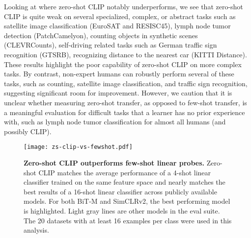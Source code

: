 \documentclass{article}
\begin{document}
Looking at where zero-shot CLIP notably underperforms, we see that zero-shot CLIP is quite weak on several specialized, complex, or abstract tasks such as satellite image classification (EuroSAT and RESISC45), lymph node tumor detection (PatchCamelyon), counting objects in synthetic scenes (CLEVRCounts), self-driving related tasks such as German traffic sign recognition (GTSRB), recognizing distance to the nearest car (KITTI Distance). These results highlight the poor capability of zero-shot CLIP on more complex tasks. By contrast, non-expert humans can robustly perform several of these tasks, such as counting, satellite image classification, and traffic sign recognition, suggesting significant room for improvement. However, we caution that it is unclear whether measuring zero-shot transfer, as opposed to few-shot transfer, is a meaningful evaluation for difficult tasks that a learner has no prior experience with, such as lymph node tumor classification for almost all humans (and possibly CLIP). 



\begin{figure}[t]
\begin{center}
\centerline{\texttt{[image: zs-clip-vs-fewshot.pdf]}}
\caption{\textbf{Zero-shot CLIP outperforms few-shot linear probes.} Zero-shot CLIP matches the average performance of a 4-shot linear classifier trained on the same feature space and nearly matches the best results of a 16-shot linear classifier across publicly available models. For both BiT-M and SimCLRv2, the best performing model is highlighted. Light gray lines are other models in the eval suite. The 20 datasets with at least 16 examples per class were used in this analysis.}
\label{zeroshot_vs_fewshot}
\end{center}
\vspace{-2em}
\end{figure}
\end{document}
